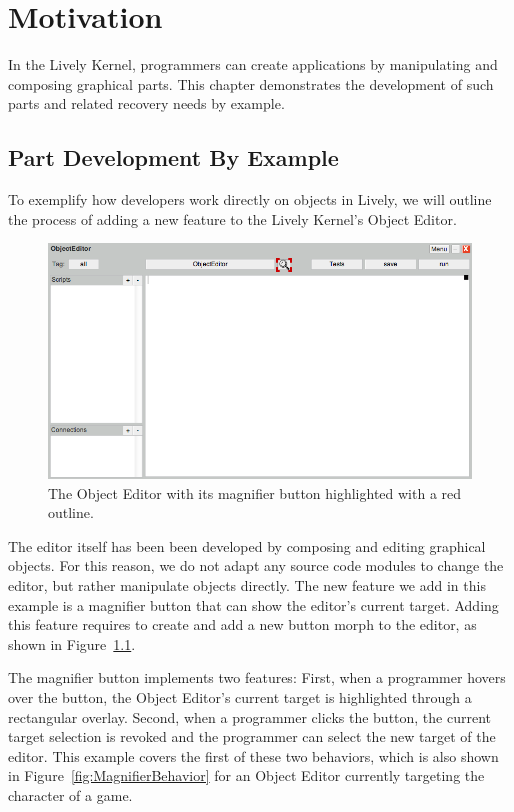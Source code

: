 \chapter{Motivation} \label{chapter:MOTIVATION}

In the Lively Kernel, programmers can create applications by manipulating and composing graphical parts.
This chapter demonstrates the development of such parts and related recovery needs by example.


\section{Part Development By Example}

To exemplify how developers work directly on objects in Lively, we will outline the process of adding a new feature to the Lively Kernel's Object Editor.

\begin{figure}[h]
    \centering
    \includegraphics[width=\textwidth]{figures/3_motivation/1_magnifierButton.png}
    \caption{The Object Editor with its magnifier button highlighted with a red outline.}
    \label{fig:MagnifierButton}
\end{figure}

The editor itself has been been developed by composing and editing graphical objects.
For this reason, we do not adapt any source code modules to change the editor, but rather manipulate objects directly.
The new feature we add in this example is a magnifier button that can show the editor's current target.
Adding this feature requires to create and add a new button morph to the editor, as shown in Figure~\ref{fig:MagnifierButton}.

The magnifier button implements two features: First, when a programmer hovers over the button, the Object Editor's current target is highlighted through a rectangular overlay. Second, when a programmer clicks the button, the current target selection is revoked and the programmer can select the new target of the editor.
This example covers the first of these two behaviors, which is also shown in Figure~\ref{fig:MagnifierBehavior} for an Object Editor currently targeting the character of a game.

